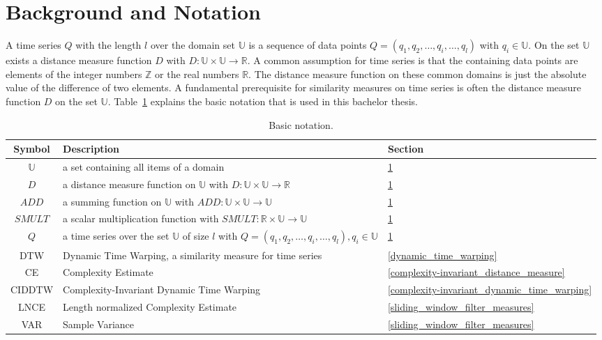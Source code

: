 \section{Background and Notation} \label{background_and_notation}
A time series $Q$ with the length $l$ over the domain set $\mathbb{U}$ is a sequence of data points
$Q = (q_1, q_2, \dots, q_i, \dots, q_l)$ with $q_i \in \mathbb{U}$. On the set $\mathbb{U}$ exists a distance measure
function $D$ with $D: \mathbb{U} \times \mathbb{U} \to \mathbb{R}$. A common assumption for time series is that the
containing data points are elements of the integer numbers $\mathbb{Z}$ or the real numbers $\mathbb{R}$. The distance
measure function on these common domains is just the absolute value of the difference of two elements. A fundamental
prerequisite for similarity measures on time series is often the distance measure function $D$ on the set
$\mathbb{U}$. Table~\ref{tab:notation} explains the basic notation that is used in this bachelor thesis.

\begin{table}
    \begin{center}
        \begin{tabularx}{\textwidth}{c X l}
            \textbf{Symbol} \qquad & \textbf{Description} & \qquad \textbf{Section}\\
            \hline
            $\mathbb{U}$ & a set containing all items of a domain & \qquad \ref{background_and_notation}\\
            $D$ & a distance measure function on $\mathbb{U}$ with $D: \mathbb{U} \times \mathbb{U} \to \mathbb{R}$
                & \qquad \ref{background_and_notation}\\
            $ADD$ & a summing function on $\mathbb{U}$ with $ADD: \mathbb{U} \times \mathbb{U} \to \mathbb{U}$
                & \qquad \ref{background_and_notation}\\
            $SMULT$ & a scalar multiplication function with $SMULT: \mathbb{R} \times \mathbb{U} \to \mathbb{U}$
                & \qquad \ref{background_and_notation}\\
            $Q$ & a time series over the set $\mathbb{U}$ of size $l$ with
                $Q = (q_1, q_2, \dots, q_i, \dots, q_l), q_i \in \mathbb{U}$ & \qquad \ref{background_and_notation}\\
            DTW & Dynamic Time Warping, a similarity measure for time series & \qquad \ref{dynamic_time_warping}\\
            CE & Complexity Estimate & \qquad \ref{complexity-invariant_distance_measure}\\
            CIDDTW & Complexity-Invariant Dynamic Time Warping
                & \qquad \ref{complexity-invariant_dynamic_time_warping}\\
            LNCE & Length normalized Complexity Estimate & \qquad \ref{sliding_window_filter_measures}\\
            VAR & Sample Variance & \qquad \ref{sliding_window_filter_measures}\\
        \end{tabularx}
    \end{center}
    \caption{Basic notation.}
	\label{tab:notation}
\end{table}




